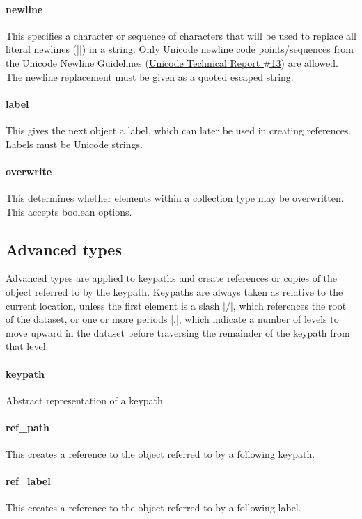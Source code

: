 \documentclass[11pt]{article}
\begin{document}
{{\paragraph{newline}
This specifies a character or sequence of characters that will be used to replace all literal newlines (|\n|) in a string.  Only Unicode newline code points/sequences from the Unicode Newline Guidelines (\href{http://unicode.org/standard/reports/tr13/tr13-5.html}{Unicode Technical Report \#13}) are allowed.  The newline replacement must be given as a quoted escaped string.

\paragraph{label}
This gives the next object a label, which can later be used in creating references.  Labels must be Unicode strings.

\paragraph{overwrite}
This determines whether elements within a collection type may be overwritten.  This accepts boolean options.


\subsection{Advanced types}
Advanced types are applied to keypaths and create references or copies of the object referred to by the keypath.  Keypaths are always taken as relative to the current location, unless the first element is a slash |/|, which references the root of the dataset, or one or more periods |.|, which indicate a number of levels to move upward in the dataset before traversing the remainder of the keypath from that level.


\paragraph{keypath}
Abstract representation of a keypath.

\paragraph{ref\_path}
This creates a reference to the object referred to by a following keypath.

\paragraph{ref\_label}
This creates a reference to the object referred to by a following label.

}}
\end{document}

